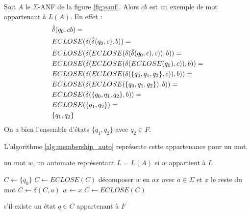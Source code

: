 \begin{example}
  Soit $A$ le $\Sigma$-ANF de la figure \ref{fig:eanf}. Alors $cb$ est un exemple de mot appartenant à $L(A)$. En effet :
  \begin{align*}
    &\hat{\delta}(q_0,cb)=\\
    &ECLOSE(\delta(\hat{\delta}(q_0, c),b))=\\
    &ECLOSE(\delta(ECLOSE(\delta(\hat{\delta}(q_0,\epsilon),c)),b))=\\
    &ECLOSE(\delta(ECLOSE(\delta(ECLOSE(q_0),c)),b))=\\
    &ECLOSE(\delta(ECLOSE(\delta(\{q_0,q_1,q_2\},c)),b))=\\
    &ECLOSE(\delta(ECLOSE(\{q_0,q_1,q_2\}),b))=\\
    &ECLOSE(\delta(\{q_0,q_1,q_2\},b))=\\
    &ECLOSE(\{q_1,q_2\})=\\
    &\{q_1,q_2\}
  \end{align*}
  On a bien l'ensemble d'états $\{q_1,q_2\}$ avec $q_2\in F$.
\end{example}

L'algorithme \ref{alg:membership_auto} représente cette appartenance pour un mot.


\begin{algo}\label{alg:membership_auto}
 \begin{algorithmic}[1]
   \REQUIRE un mot $w$, un automate \automaton représentant $L=L(A)$
   \ENSURE si $w$ appartient à $L$

   \STATE $C \leftarrow \{q_0\}$ 
   \STATE $C \leftarrow ECLOSE(C)$
   \ENDIF
   \STATE décomposer $w$ en $ax$ avec $a\in\Sigma$ et $x$ le reste du mot
   \STATE $C \leftarrow \delta(C,a)$ 
   \STATE {}
   \STATE $w \leftarrow x$
   \STATE $C \leftarrow ECLOSE(C)$
   \ENDIF
   \ENDWHILE

   \RETURN s'il existe un état $q \in C$ appartenant à $F$
 \end{algorithmic}
\end{algo}

